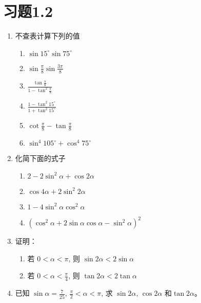 \section*{习题1.2}
\begin{enumerate}
    \item 不查表计算下列的值
\begin{multicols}{2}
\begin{enumerate}
    \item $\sin 15^{\circ} \sin 75^{\circ}$
    \item $\sin \frac{\pi}{8} \sin \frac{3 \pi}{8}$
    \item $\frac{\tan\frac{\pi}{8}}{1-\tan^2\frac{\pi}{8}}$
    \item $\frac{1-\tan^2 15^{\circ}}{1+\tan^2 15^{\circ}}$
    \item $\cot\frac{\pi}{8}-\tan\frac{\pi}{8}$
    \item $\sin^{4} 105^{\circ}+\cos^{4} 75^{\circ}$
\end{enumerate}
\end{multicols}

\item 化简下面的式子
\begin{multicols}{2}
    \begin{enumerate}
        \item  $2-2 \sin ^{2} \alpha+\cos 2 \alpha$
        \item  $\cos 4 \alpha+2 \sin ^{2} 2 \alpha$
        \item $1-4 \sin ^{2} \alpha \cos ^{2} \alpha$
\item $\left(\cos ^{2} \alpha+2 \sin \alpha \cos \alpha-\sin ^{2} \alpha\right)^{2}$
\end{enumerate}
\end{multicols}

\item 证明：
\begin{enumerate}
    \item 若 $0<\alpha<\pi$, 则 $\sin 2 \alpha<2 \sin \alpha$
    \item 若 $0<\alpha<\frac{\pi}{4}$, 则 $\tan 2 \alpha<2\tan  \alpha$
\end{enumerate}

\item  已知 $\sin \alpha=\frac{7}{25}$, $\frac{\pi}{2}<\alpha<\pi$,
求 $\sin 2 \alpha$, $\cos 2 \alpha$ 和$\tan 2 \alpha$。


\end{enumerate}

